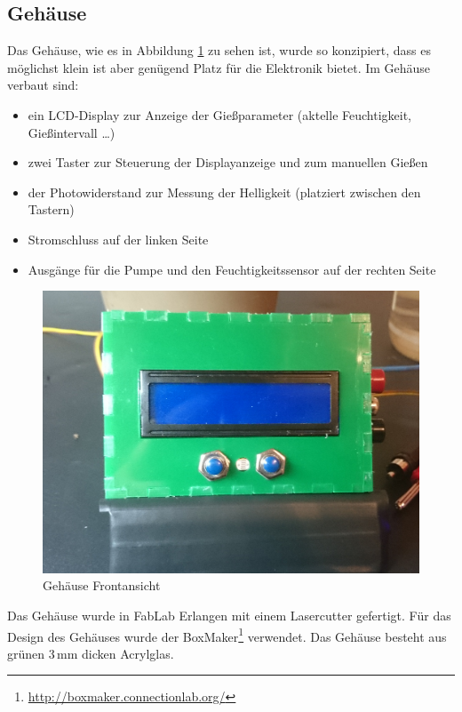 	

\subsection{Gehäuse}
	Das Gehäuse, wie es in Abbildung \ref{fig-Gehäuse} zu sehen ist, wurde so konzipiert, dass es möglichst klein ist aber genügend Platz für die Elektronik bietet.
	Im Gehäuse verbaut sind:
\begin{itemize}
	\item ein LCD-Display zur Anzeige der Gießparameter (aktelle Feuchtigkeit, Gießintervall \dots)
	\item zwei Taster zur Steuerung der Displayanzeige und zum manuellen Gießen
	\item der Photowiderstand zur Messung der Helligkeit (platziert zwischen den Tastern)
	\item Stromschluss auf der linken Seite
	\item Ausgänge für die Pumpe und den Feuchtigkeitssensor auf der rechten Seite

\end{itemize}	

	\begin{figure}[!h]
	\centering
	\includegraphics[width=0.9\linewidth]{bilder/_boxFron1.jpg}	
	\caption{Gehäuse Frontansicht}
	\label{fig-Gehäuse}
	\end{figure}
	
Das Gehäuse wurde in FabLab Erlangen mit einem Lasercutter gefertigt. 
Für das Design des Gehäuses wurde der BoxMaker\footnote{ \href{http://boxmaker.connectionlab.org/}{http://boxmaker.connectionlab.org/}} verwendet. 
Das Gehäuse besteht aus grünen 3\,mm dicken Acrylglas.
	
